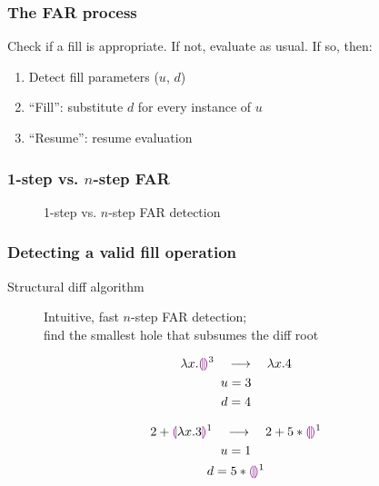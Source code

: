 \documentclass{beamer}
\begin{document}
\begin{frame}
  \frametitle{The FAR process}

  Check if a fill is appropriate. If not, evaluate as usual. If so, then:

  \begin{enumerate}
  \item Detect fill parameters ($u$, $d$)
  \item ``Fill'': substitute $d$ for every instance of $u$
  \item ``Resume'': resume evaluation
  \end{enumerate}
\end{frame}

\begin{frame}
  \frametitle{1-step vs. $n$-step FAR}

  \begin{figure}
    \centering
    \maxsizebox{\textwidth}{15em}{
      
    }
    \caption{1-step vs. $n$-step FAR detection}
    \label{fig:one-vs-n-step-far}
  \end{figure}
\end{frame}

\begin{frame}
  \frametitle{Detecting a valid fill operation}

  \begin{description}
  \item[Structural diff algorithm] Intuitive, fast $n$-step FAR detection; \\
    find the smallest hole that subsumes the diff root
  \end{description}

  \begin{gather*}
    \lambda x.\textcolor{violet}{\llparenthesis}\textcolor{violet}{\rrparenthesis}^3\ \ \ \longrightarrow\ \ \ \lambda x.4 \\
    u=3 \\
    d=4
  \end{gather*}

  \begin{gather*}
    2+\textcolor{violet}{\llparenthesis}\lambda x.3\textcolor{violet}{\rrparenthesis}^1\ \ \ \longrightarrow\ \ \ 2+5*\textcolor{violet}{\llparenthesis}\textcolor{violet}{\rrparenthesis}^1 \\
    u=1 \\
    d=5*\textcolor{violet}{\llparenthesis}\textcolor{violet}{\rrparenthesis}^1
  \end{gather*}
\end{frame}
\end{document}

